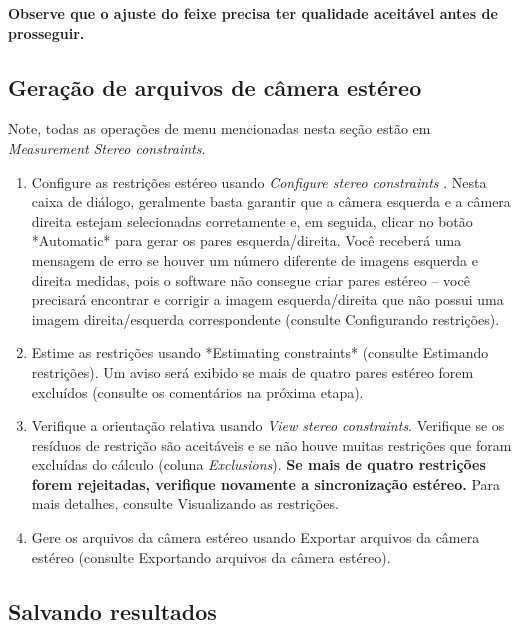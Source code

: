 \documentclass[
  12pt,
  letterpaper,
  DIV=11,
  numbers=noendperiod]{scrreprt}
\begin{document}
\textbf{Observe que o ajuste do feixe precisa ter qualidade aceitável
antes de prosseguir.}

\subsection{Geração de arquivos de câmera
estéreo}\label{gerauxe7uxe3o-de-arquivos-de-cuxe2mera-estuxe9reo-1}

Note, todas as operações de menu mencionadas nesta seção estão em
\emph{Measurement} \textbar{} \emph{Stereo constraints}.

\begin{enumerate}
\def\labelenumi{\arabic{enumi}.}
\item
  Configure as restrições estéreo usando \emph{Configure stereo
  constraints} . Nesta caixa de diálogo, geralmente basta garantir que a
  câmera esquerda e a câmera direita estejam selecionadas corretamente
  e, em seguida, clicar no botão *Automatic* para gerar os pares
  esquerda/direita. Você receberá uma mensagem de erro se houver um
  número diferente de imagens esquerda e direita medidas, pois o
  software não consegue criar pares estéreo -- você precisará encontrar
  e corrigir a imagem esquerda/direita que não possui uma imagem
  direita/esquerda correspondente (consulte Configurando restrições).
\item
  Estime as restrições usando *Estimating constraints* (consulte
  Estimando restrições). Um aviso será exibido se mais de quatro pares
  estéreo forem excluídos (consulte os comentários na próxima etapa).
\item
  Verifique a orientação relativa usando \emph{View stereo constraints}.
  Verifique se os resíduos de restrição são aceitáveis
  \hspace{0pt}\hspace{0pt}e se não houve muitas restrições que foram
  excluídas do cálculo (coluna \emph{Exclusions}). \textbf{Se mais de
  quatro restrições forem rejeitadas, verifique novamente a
  sincronização estéreo.} Para mais detalhes, consulte Visualizando as
  restrições.
\item
  Gere os arquivos da câmera estéreo usando Exportar arquivos da câmera
  estéreo (consulte Exportando arquivos da câmera estéreo).
\end{enumerate}

\subsection{Salvando resultados}\label{salvando-resultados-1}
\end{document}
